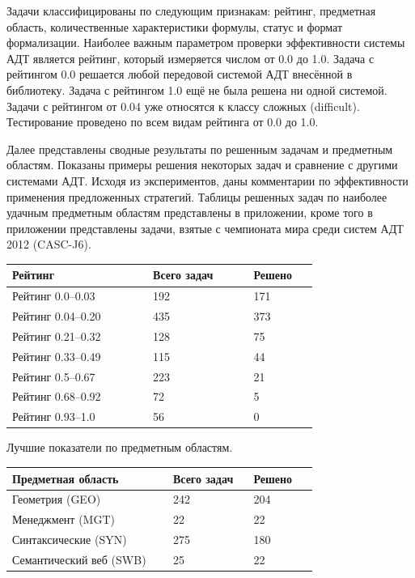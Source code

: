 \documentclass[a4paper]{report}
\begin{document}
Задачи классифицированы по следующим признакам: рейтинг, предметная область, количественные характеристики формулы, статус и формат формализации. Наиболее важным параметром проверки эффективности системы АДТ является рейтинг, который измеряется числом от 0.0 до 1.0. Задача с рейтингом 0.0 решается любой передовой системой АДТ внесённой в библиотеку. Задача с рейтингом 1.0 ещё не была решена ни одной системой. Задачи с рейтингом от 0.04 уже относятся к классу сложных (difficult). Тестирование проведено по всем видам рейтинга от 0.0 до 1.0.

Далее представлены сводные результаты по решенным задачам и предметным областям. Показаны примеры решения некоторых задач и сравнение с другими системами АДТ. Исходя из экспериментов, даны комментарии по эффективности применения предложенных стратегий. Таблицы решенных задач по наиболее удачным предметным областям представлены в приложении, кроме того в приложении представлены задачи, взятые с чемпионата мира среди систем АДТ 2012 (CASC-J6).



\begin{longtable}[H]{|p{0.35\linewidth}|p{0.25\linewidth}|p{0.15\linewidth}|}
\hline
\textbf{Рейтинг} & \textbf{Всего задач} & \textbf{Решено} \\
\hline
Рейтинг 0.0--0.03 & 192 & 171 \\
\hline
Рейтинг 0.04--0.20 & 435 & 373 \\
\hline
Рейтинг 0.21--0.32 & 128 & 75 \\
\hline
Рейтинг 0.33--0.49 & 115 & 44 \\
\hline
Рейтинг 0.5--0.67 & 223 & 21 \\
\hline
Рейтинг 0.68--0.92 & 72 & 5 \\
\hline
Рейтинг 0.93--1.0 & 56 & 0\\
\hline
\end{longtable}


Лучшие показатели по предметным областям.

\begin{longtable}[H]{|p{0.4\linewidth}|p{0.2\linewidth}|p{0.15\linewidth}|}
\hline
\textbf{Предметная область} & \textbf{Всего задач} & \textbf{Решено} \\
\hline
Геометрия (GEO) & 242 & 204 \\
\hline
Менеджмент (MGT) & 22 & 22 \\
\hline
Синтаксические (SYN) & 275 & 180 \\
\hline
Семантический веб (SWB) & 25 & 22 \\
\hline
\end{longtable}
\end{document}
